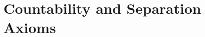 \documentclass[../main.tex]{subfiles}
\begin{document}
\chapter{Countability and Separation Axioms}
%
\todo{}
\end{document}

